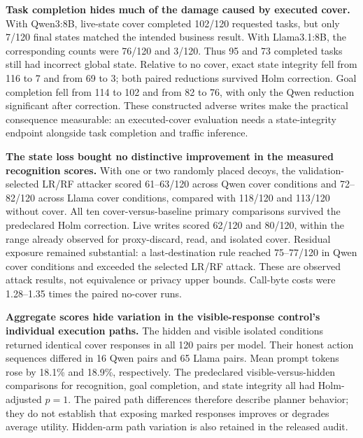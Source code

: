 \textbf{Task completion hides much of the damage caused by executed cover.}
With Qwen3:8B, live-state cover completed 102/120 requested tasks, but only
7/120 final states matched the intended business result. With Llama3.1:8B,
the corresponding counts were 76/120 and 3/120. Thus 95 and 73 completed
tasks still had incorrect global state. Relative to no cover, exact state
integrity fell from 116 to 7 and from 69 to 3; both paired reductions
survived Holm correction. Goal completion fell from 114 to 102 and from
82 to 76, with only the Qwen reduction significant after correction.
These constructed adverse writes make the practical consequence measurable:
an executed-cover evaluation needs a state-integrity endpoint alongside
task completion and traffic inference.

\textbf{The state loss bought no distinctive improvement in the measured
recognition scores.}
With one or two randomly placed decoys, the validation-selected LR/RF
attacker scored 61--63/120 across Qwen cover conditions and 72--82/120
across Llama cover conditions, compared with 118/120 and 113/120 without
cover. All ten cover-versus-baseline primary comparisons survived the
predeclared Holm correction. Live writes scored 62/120 and 80/120, within
the range already observed for proxy-discard, read, and isolated cover.
Residual exposure remained substantial: a last-destination rule reached
75--77/120 in Qwen cover conditions and exceeded the selected LR/RF attack.
These are observed attack results, not equivalence or privacy upper bounds.
Call-byte costs were 1.28--1.35 times the paired no-cover runs.

\textbf{Aggregate scores hide variation in the visible-response control's
individual execution paths.}
The hidden and visible isolated conditions returned identical cover
responses in all 120 pairs per model. Their honest action sequences
differed in 16 Qwen pairs and 65 Llama pairs. Mean prompt tokens rose by
18.1\% and 18.9\%, respectively. The predeclared visible-versus-hidden
comparisons for recognition, goal completion, and state integrity all had
Holm-adjusted $p=1$. The paired path differences therefore describe planner
behavior; they do not establish that exposing marked responses improves
or degrades average utility. Hidden-arm path variation is also retained
in the released audit.
